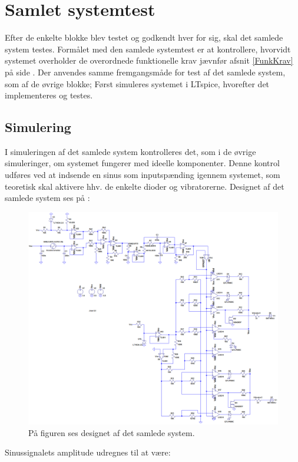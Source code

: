 \section{Samlet systemtest}
Efter de enkelte blokke blev testet og godkendt hver for sig, skal det samlede system testes. Formålet med den samlede systemtest er at kontrollere, hvorvidt systemet overholder de overordnede funktionelle krav jævnfør afsnit \ref{FunkKrav} på side \pageref{FunkKrav}. Der anvendes samme fremgangsmåde for test af det samlede system, som af de øvrige blokke; Først simuleres systemet i LTspice, hvorefter det implementeres og testes.

\subsection{Simulering}
I simuleringen af det samlede system kontrolleres det, som i de øvrige simuleringer, om systemet fungerer med ideelle komponenter. Denne kontrol udføres ved at indsende en sinus som inputspænding igennem systemet, som teoretisk skal aktivere hhv. de enkelte dioder og vibratorerne. Designet af det samlede system ses på :
\begin{figure}[H]
	\centering
	\includegraphics[scale=.38]{figures/cProblemloesning/Samlet_systemUL.PNG}
	\caption{På figuren ses designet af det samlede system.}
	\label{fig:samlet_system}
\end{figure}
\noindent Sinussignalets amplitude udregnes til at være:
